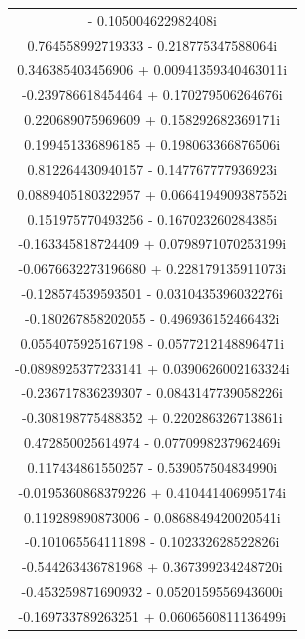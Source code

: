 \documentclass[12pt,a4paper,UTF8]{ctexart}
\begin{document}
\begin{enumerate}
\begin{longtable}{c}
              \endlastfoot
              -0.212720750765212     -   0.105004622982408i   \\
              0.764558992719333      -   0.218775347588064i   \\
              0.346385403456906      +   0.00941359340463011i \\
              -0.239786618454464     +   0.170279506264676i   \\
              0.220689075969609      +   0.158292682369171i   \\
              0.199451336896185      +   0.198063366876506i   \\
              0.812264430940157      -   0.147767777936923i   \\
              0.0889405180322957     +   0.0664194909387552i  \\
              0.151975770493256      -   0.167023260284385i   \\
              -0.163345818724409     +   0.0798971070253199i  \\
              -0.0676632273196680    +   0.228179135911073i   \\
              -0.128574539593501     -   0.0310435396032276i  \\
              -0.180267858202055     -   0.496936152466432i   \\
              0.0554075925167198     -   0.0577212148896471i  \\
              -0.0898925377233141    +   0.0390626002163324i  \\
              -0.236717836239307     -   0.0843147739058226i  \\
              -0.308198775488352     +   0.220286326713861i   \\
              0.472850025614974      -   0.0770998237962469i  \\
              0.117434861550257      -   0.539057504834990i   \\
              -0.0195360868379226    +   0.410441406995174i   \\
              0.119289890873006      -   0.0868849420020541i  \\
              -0.101065564111898     -   0.102332628522826i   \\
              -0.544263436781968     +   0.367399234248720i   \\
              -0.453259871690932     -   0.0520159556943600i  \\
              -0.169733789263251     +   0.0606560811136499i  \\

\end{longtable}
\end{enumerate}
\end{document}
